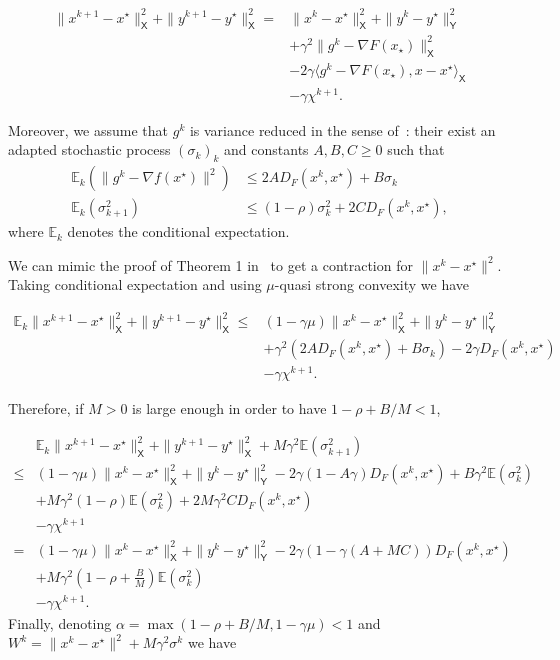 \documentclass{article}
\newcommand{\bE}{{\mathbb E}}
\newcommand{\sX}{{\mathsf X}}
\newcommand{\sY}{{\mathsf Y}}
\newcommand{\ps}[1]{\langle #1 \rangle}
\theoremstyle{definition}
\begin{document}
\begin{align*}
    \|x^{k+1} - x^\star\|_\sX^2 + \|y^{k+1} - y^\star\|_\sX^2 
    =& \|x^k - x^\star\|_\sX^2 + \|y^k - y^\star\|_\sY^2 \\
    &+ \gamma^2 \|g^k - \nabla F(x_\star) \|_\sX^2\\
    &- 2\gamma\ps{g^k - \nabla F(x_\star),x-x^\star}_\sX\\
    &-\gamma \chi^{k+1}.
\end{align*}

Moreover, we assume that $g^k$ is variance reduced in the sense of~\cite{gorbunov2019unified}: their exist an adapted stochastic process $(\sigma_k)_k$ and constants $A,B,C \geq 0$ such that
\begin{align}
    \bE_k(\|g^k - \nabla f(x^\star)\|^2) &\leq 2AD_F(x^k,x^\star) + B\sigma_k\\
    \bE_k(\sigma_{k+1}^2) &\leq (1-\rho)\sigma_k^2 + 2CD_F(x^k,x^\star),
\end{align}
where $\bE_k$ denotes the conditional expectation.


We can mimic the proof of Theorem 1 in~\cite{gorbunov2019unified} to get a contraction for $\|x^k-x^\star\|^2$.
Taking conditional expectation and using $\mu$-quasi strong convexity we have

\begin{align*}
    \bE_k \|x^{k+1} - x^\star\|_\sX^2 + \|y^{k+1} - y^\star\|_\sX^2 
    \leq& (1-\gamma\mu)\|x^k - x^\star\|_\sX^2 + \|y^k - y^\star\|_\sY^2 \\
    &+ \gamma^2 (2AD_F(x^k,x^\star) + B\sigma_k) - 2\gamma D_F(x^k,x^\star)\\
    &-\gamma\chi^{k+1}.
\end{align*}

Therefore, if $M>0$ is large enough in order to have $1-\rho+B/M < 1$,

\begin{align*}
    &\bE_k \|x^{k+1} - x^\star\|_\sX^2 + \|y^{k+1} - y^\star\|_\sX^2 + M\gamma^2\bE(\sigma_{k+1}^2)\\
    \leq& (1-\gamma\mu)\|x^k - x^\star\|_\sX^2 + \|y^k - y^\star\|_\sY^2 -2\gamma(1-A\gamma)D_F(x^k,x^\star) + B\gamma^2\bE(\sigma_k^2)\\
     &+ M\gamma^2(1-\rho)\bE(\sigma_k^2)+ 2M\gamma^2CD_F(x^k,x^\star)\\
    &-\gamma\chi^{k+1}\\
    =& (1-\gamma\mu)\|x^k - x^\star\|_\sX^2 + \|y^k - y^\star\|_\sY^2 -2\gamma(1-\gamma(A+MC))D_F(x^k,x^\star)\\
     &+ M\gamma^2(1-\rho+\frac{B}{M})\bE(\sigma_k^2)\\
    &-\gamma\chi^{k+1}.
\end{align*}
Finally, denoting $\alpha = \max(1-\rho+B/M,1-\gamma\mu) < 1$ and $W^k = \|x^k-x^\star\|^2 + M\gamma^2\sigma^k$ we have
\end{document}
